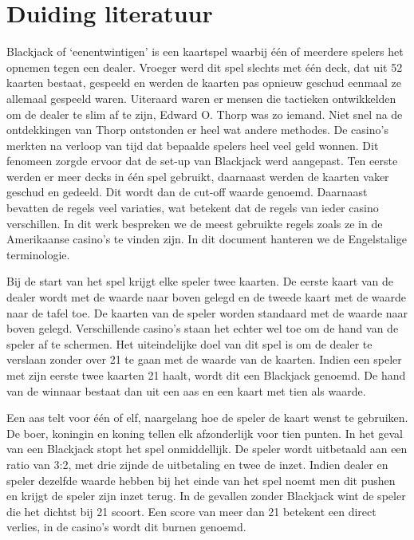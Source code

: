 \documentclass[11pt, final, journal, a4paper]{IEEEtran}
\begin{document}
\section{Duiding literatuur}
Blackjack of `eenentwintigen' is een kaartspel waarbij één of meerdere spelers het opnemen tegen een dealer. Vroeger werd dit spel slechts met één deck, dat uit 52 kaarten bestaat,  gespeeld en werden de kaarten pas opnieuw geschud eenmaal ze allemaal gespeeld waren. Uiteraard waren er mensen die tactieken ontwikkelden om de dealer te slim af te zijn, Edward O. Thorp was zo iemand. Niet snel na de ontdekkingen van Thorp ontstonden er heel wat andere methodes. De casino's merkten na verloop van tijd dat bepaalde spelers heel veel geld wonnen. Dit fenomeen zorgde ervoor dat de set-up van Blackjack werd aangepast. Ten eerste werden er meer decks in één spel gebruikt, daarnaast werden de kaarten vaker geschud en gedeeld. Dit wordt dan de cut-off waarde genoemd.\citep{Wong1992BasicBlackjack, van1997blackjack, fogel2004evolving,Wong1993BlackJackSecrets} Daarnaast bevatten de regels veel variaties, wat betekent dat de regels van ieder casino verschillen. In dit werk bespreken we de meest gebruikte regels zoals ze in de Amerikaanse casino's te vinden zijn. In dit document hanteren we de Engelstalige terminologie. 

Bij de start van het spel krijgt elke speler twee kaarten. De eerste kaart van de dealer wordt met de waarde naar boven gelegd en de tweede kaart met de waarde naar de tafel toe. De kaarten van de speler worden standaard met de waarde naar boven gelegd. Verschillende casino’s staan het echter wel toe om de hand van de speler af te schermen. Het uiteindelijke doel van dit spel is om de dealer te verslaan zonder over 21 te gaan met de waarde van de kaarten. Indien een speler met zijn eerste twee kaarten 21 haalt, wordt dit een Blackjack genoemd. De hand van de winnaar bestaat dan uit een aas en een kaart met tien als waarde.

Een aas telt voor één of elf, naargelang hoe de speler de kaart wenst te gebruiken. De boer, koningin en koning tellen elk afzonderlijk voor tien punten. In het geval van een Blackjack stopt het spel onmiddellijk. De speler wordt uitbetaald aan een ratio van 3:2, met drie zijnde de uitbetaling en twee de inzet. Indien dealer en speler dezelfde waarde hebben bij het einde van het spel noemt men dit pushen en krijgt de speler zijn inzet terug. In de gevallen zonder Blackjack wint de speler die het dichtst bij 21 scoort. Een score van meer dan 21 betekent een direct verlies, in de casino’s wordt dit burnen genoemd. 
\end{document}
